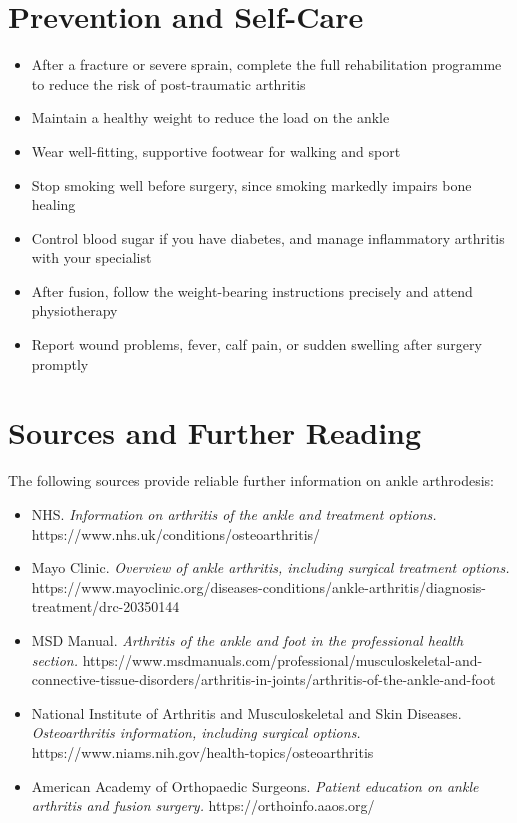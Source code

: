\section*{Prevention and Self-Care}
\begin{itemize}
    \item After a fracture or severe sprain, complete the full rehabilitation programme to reduce the risk of post-traumatic arthritis
    \item Maintain a healthy weight to reduce the load on the ankle
    \item Wear well-fitting, supportive footwear for walking and sport
    \item Stop smoking well before surgery, since smoking markedly impairs bone healing
    \item Control blood sugar if you have diabetes, and manage inflammatory arthritis with your specialist
    \item After fusion, follow the weight-bearing instructions precisely and attend physiotherapy
    \item Report wound problems, fever, calf pain, or sudden swelling after surgery promptly
\end{itemize}

\section*{Sources and Further Reading}
The following sources provide reliable further information on ankle arthrodesis:

\begin{itemize}
    \item NHS. \textit{Information on arthritis of the ankle and treatment options.} https://www.nhs.uk/conditions/osteoarthritis/
    \item Mayo Clinic. \textit{Overview of ankle arthritis, including surgical treatment options.} https://www.mayoclinic.org/diseases-conditions/ankle-arthritis/diagnosis-treatment/drc-20350144
    \item MSD Manual. \textit{Arthritis of the ankle and foot in the professional health section.} https://www.msdmanuals.com/professional/musculoskeletal-and-connective-tissue-disorders/arthritis-in-joints/arthritis-of-the-ankle-and-foot
    \item National Institute of Arthritis and Musculoskeletal and Skin Diseases. \textit{Osteoarthritis information, including surgical options.} https://www.niams.nih.gov/health-topics/osteoarthritis
    \item American Academy of Orthopaedic Surgeons. \textit{Patient education on ankle arthritis and fusion surgery.} https://orthoinfo.aaos.org/
\end{itemize}
